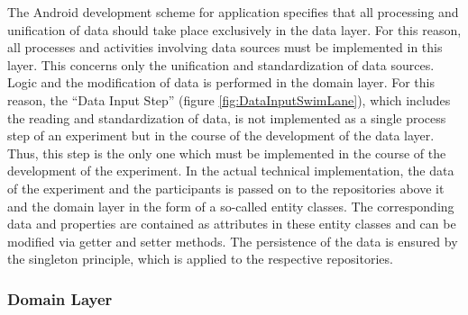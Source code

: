 

The Android development scheme for application specifies that all processing and unification of data should take place exclusively in the data layer. For this reason, all processes and activities involving data sources must be implemented in this layer. This concerns only the unification and standardization of data sources. Logic and the modification of data is performed in the domain layer. For this reason, the \enquote{Data Input Step} (figure \ref{fig:DataInputSwimLane}), which includes the reading and standardization of data, is not implemented as a single process step of an experiment but in the course of the development of the data layer. Thus, this step is the only one which must be implemented in the course of the development of the experiment. In the actual technical implementation, the data of the experiment and the participants is passed on to the repositories above it and the domain layer in the form of a so-called entity classes. The corresponding data and properties are contained as attributes in these entity classes and can be modified via getter and setter methods. The persistence of the data is ensured by the singleton principle, which is applied to the respective repositories.

\subsubsection{Domain Layer}

